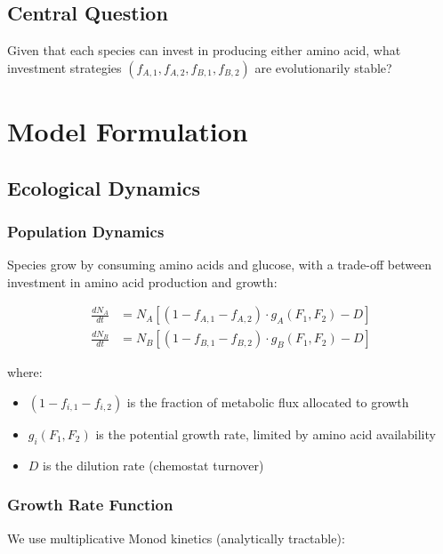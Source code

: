 \documentclass[11pt]{article}
\theoremstyle{definition}
\theoremstyle{remark}
\newcommand{\ddt}[1]{\frac{d#1}{dt}}
\begin{document}
\subsection{Central Question}

Given that each species can invest in producing either amino acid, what investment strategies $(f_{A,1}, f_{A,2}, f_{B,1}, f_{B,2})$ are evolutionarily stable?

\section{Model Formulation}

\subsection{Ecological Dynamics}

\subsubsection{Population Dynamics}

Species grow by consuming amino acids and glucose, with a trade-off between investment in amino acid production and growth:

\begin{align}
\ddt{N_A} &= N_A \left[ (1 - f_{A,1} - f_{A,2}) \cdot g_A(F_1, F_2) - D \right] \label{eq:NA}\\
\ddt{N_B} &= N_B \left[ (1 - f_{B,1} - f_{B,2}) \cdot g_B(F_1, F_2) - D \right] \label{eq:NB}
\end{align}

where:
\begin{itemize}
    \item $(1 - f_{i,1} - f_{i,2})$ is the fraction of metabolic flux allocated to growth
    \item $g_i(F_1, F_2)$ is the potential growth rate, limited by amino acid availability
    \item $D$ is the dilution rate (chemostat turnover)
\end{itemize}

\subsubsection{Growth Rate Function}

We use multiplicative Monod kinetics (analytically tractable):
\end{document}
